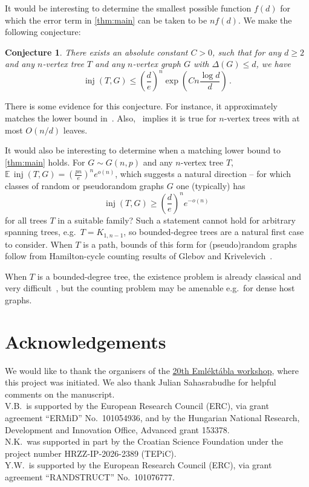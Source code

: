 \documentclass[10pt,a4paper]{amsart}
\numberwithin{equation}{section}
\newtheorem{conjecture}[theorem]{Conjecture}
\theoremstyle{definition}
\theoremstyle{remark}
\DeclareMathOperator{\inj}{inj}
\begin{document}
It would be interesting to determine the smallest possible function
$f(d)$ for which the error term in \cref{thm:main} can be taken to be $nf(d)$. 
We make the following conjecture:
\begin{conjecture}
    There exists an absolute constant $C>0$, such that for any $d\geq 2$ and any $n$-vertex tree $T$ and any $n$-vertex graph $G$ with $\Delta(G)\leq d$, we have 
    \[
        \inj(T,G)\leq \left(\frac{d}{e}\right)^n \exp\left(Cn\frac{\log d}{d}\right)\,.
    \]
\end{conjecture}
There is some evidence for this conjecture. For instance, it approximately matches the lower bound in~. Also,~ implies it is true for $n$-vertex trees with at most $O(n/d)$ leaves.

It would also be interesting to determine when a matching lower bound to \cref{thm:main} holds. For $G \sim G(n,p)$ and any $n$-vertex tree $T$, $\mathbb E \, \inj(T,G) = \left( \frac{pn}{e} \right)^n e^{o(n)}$, which suggests a natural direction -- for which classes of random or pseudorandom graphs $G$ one (typically) has
$$ \inj(T,G) \geq \left(\frac de\right)^n e^{-o(n)}\,$$
for all trees $T$ in a suitable family? Such a statement cannot hold for arbitrary spanning trees, e.g.~$T= K_{1,n-1}$, so bounded-degree trees are a natural first case to consider. When $T$ is a path, bounds of this form for (pseudo)random graphs follow from Hamilton-cycle counting results of Glebov and Krivelevich~\cite{glebov2013hamilton,Krivelevich2012Pseudo}. 

When $T$ is a bounded-degree tree, the existence problem is already classical and  very difficult~\cite{montgomery2019,hyde2025}, but the counting problem may be amenable e.g.~for dense host graphs. 

\section*{Acknowledgements}
We would like to thank the organisers of the \href{https://www.renyi.hu/~emlektab/main_news.html}{20th Eml\'ekt\'abla workshop}, where this project was initiated. We also thank Julian Sahasrabudhe for helpful comments on the manuscript.\\
V.B.~is supported by the European Research Council (ERC), via grant agreement ``ERMiD'' No.\ 101054936, and by the Hungarian National Research, Development and Innovation Office, Advanced grant 153378. \\
N.K.~was supported in part by the Croatian Science Foundation under the project number HRZZ-IP-2026-2389 (TEPiC).\\
Y.W.~is supported by the European Research Council (ERC), via grant agreement ``RANDSTRUCT'' No.\ 101076777.
\end{document}
